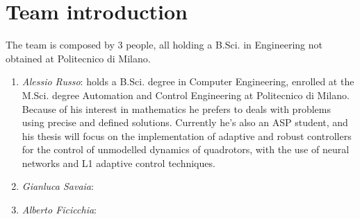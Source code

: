 \chapter{Team introduction}
The team is composed by 3 people, all holding a B.Sci. in Engineering not obtained at Politecnico di Milano. 
\begin{enumerate}
\item \emph{Alessio Russo}: holds a B.Sci. degree in Computer Engineering, enrolled at the M.Sci. degree Automation and Control Engineering at Politecnico di Milano. Because of his interest in mathematics he prefers to deals with problems using precise and defined solutions. Currently he's also an ASP student, and his thesis will focus on the implementation of adaptive and robust controllers for the control of unmodelled dynamics of quadrotors, with the use of neural networks and L1 adaptive control techniques. 
\item \emph{Gianluca Savaia}:
\item \emph{Alberto Ficicchia}:
\end{enumerate}